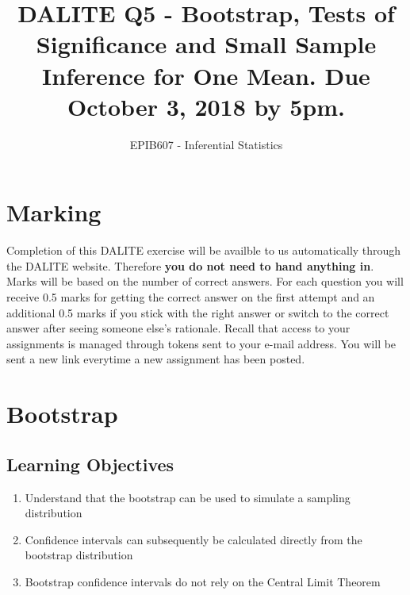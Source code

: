 \documentclass[letterpaper,9pt,twocolumn,twoside,printwatermark=false]{pinp}
\title{DALITE Q5 - Bootstrap, Tests of Significance and Small Sample Inference
for One Mean. Due October 3, 2018 by 5pm.}
\author[a]{EPIB607 - Inferential Statistics}
\affil[a]{Fall 2018, McGill University}
\providecommand{\tightlist}{%
  \setlength{\itemsep}{0pt}\setlength{\parskip}{0pt}}
\begin{document}
\verticaladjustment{-2pt}

\maketitle
\thispagestyle{firststyle}



\section*{Marking}\label{marking}

Completion of this DALITE exercise will be availble to us automatically
through the DALITE website. Therefore \textbf{you do not need to hand
anything in}. Marks will be based on the number of correct answers. For
each question you will receive 0.5 marks for getting the correct answer
on the first attempt and an additional 0.5 marks if you stick with the
right answer or switch to the correct answer after seeing someone else's
rationale. Recall that access to your assignments is managed through
tokens sent to your e-mail address. You will be sent a new link
everytime a new assignment has been posted.

\section{Bootstrap}\label{bootstrap}

\subsection{Learning Objectives}\label{learning-objectives}

\begin{enumerate}
\def\labelenumi{\arabic{enumi}.}
\tightlist
\item
  Understand that the bootstrap can be used to simulate a sampling
  distribution
\item
  Confidence intervals can subsequently be calculated directly from the
  bootstrap distribution
\item
  Bootstrap confidence intervals do not rely on the Central Limit
  Theorem
\end{enumerate}
\end{document}
